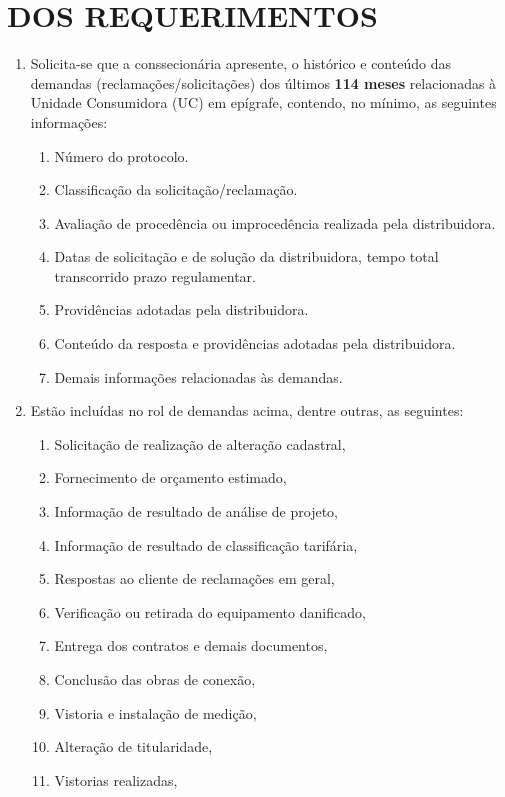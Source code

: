 \section{DOS REQUERIMENTOS}

\begin{enumerate}[resume]

\item Solicita-se que a conssecionária apresente, o histórico e conteúdo das demandas (reclamações/solicitações) dos últimos \textbf{114 meses} relacionadas à Unidade Consumidora (UC) em epígrafe, contendo, no mínimo, as seguintes informações:  
  \begin{enumerate}
    \item Número do protocolo.  
    \item Classificação da solicitação/reclamação.  
    \item Avaliação de procedência ou improcedência realizada pela distribuidora.  
    \item Datas de solicitação e de solução da distribuidora, tempo total transcorrido prazo regulamentar.  
    \item Providências adotadas pela distribuidora.  
    \item Conteúdo da resposta e providências adotadas pela distribuidora.  
    \item Demais informações relacionadas às demandas. 
  \end{enumerate}
\item Estão incluídas no rol de demandas acima, dentre outras, as seguintes:
  \begin{enumerate}
    \item Solicitação de realização de alteração cadastral,
    \item Fornecimento de orçamento estimado,
    \item Informação de resultado de análise de projeto,
    \item Informação de resultado de classificação tarifária,
    \item Respostas ao cliente de reclamações em geral,
    \item Verificação ou retirada do equipamento danificado,
    \item Entrega dos contratos e demais documentos,
    \item Conclusão das obras de conexão,
    \item Vistoria e instalação de medição,
    \item Alteração de titularidade,
    \item Vistorias realizadas,

\end{enumerate}
\end{enumerate}
